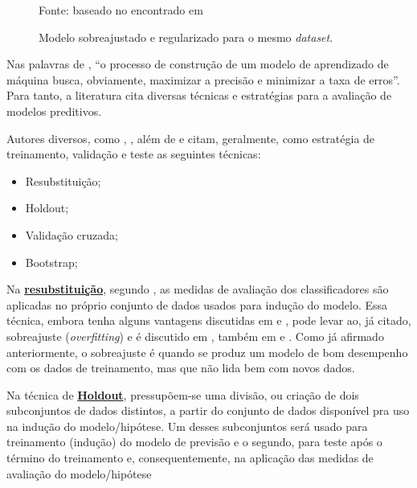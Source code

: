 \begin{figure}[h!]
	\centering
	\caption{Modelo sobreajustado e regularizado para o mesmo \textit{dataset}.}
	
	{\scriptsize Fonte: baseado no encontrado em }
	\label{fig:overfitting}
\end{figure}

Nas palavras de , ``o processo de construção de um modelo de aprendizado de máquina busca, obviamente, maximizar a precisão e minimizar a taxa de erros''. Para tanto, a literatura cita diversas técnicas e estratégias para a avaliação de modelos preditivos. 

Autores diversos, como , , além de   e  citam, geralmente, como estratégia de treinamento, validação e teste as seguintes técnicas:
\begin{itemize}
	\item Resubstituição;
	\item Holdout;
	\item Validação cruzada;
	\item Bootstrap;
\end{itemize}

Na \textbf{\underline{resubstituição}}, segundo , as medidas de avaliação dos classificadores são aplicadas no próprio conjunto de dados usados para indução do modelo. Essa técnica, embora tenha alguns vantagens discutidas em  e , pode levar ao, já citado, sobreajuste (\textit{overfitting}) e é discutido em , também em  e . Como já afirmado anteriormente, o sobreajuste é quando se produz um modelo de bom desempenho com os dados de treinamento, mas que não lida bem com novos dados.

Na técnica de \textbf{\underline{Holdout}}, pressupõem-se uma divisão, ou criação de dois subconjuntos de dados distintos, a partir do conjunto de dados disponível pra uso na indução do modelo/hipótese. Um desses subconjuntos será usado para treinamento (indução) do modelo de previsão e o segundo, para teste após o término do treinamento e, consequentemente, na aplicação das medidas de avaliação do modelo/hipótese \cite{Boscarioli2017}

